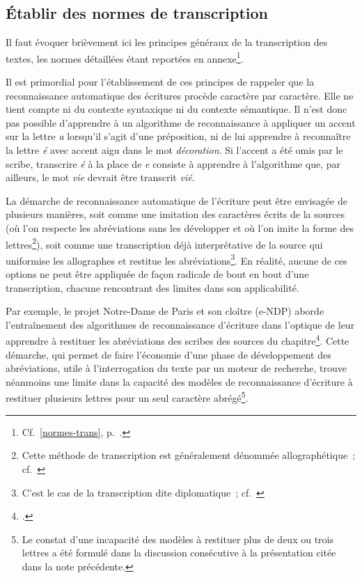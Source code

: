 \documentclass[a4paper,12pt,twoside]{book}
\begin{document}
			\subsection{Établir des normes de transcription}
				Il faut évoquer brièvement ici les principes généraux de la transcription des textes, les normes détaillées étant reportées en annexe\footnote{Cf.~\ref{normes-trans}, p.~\pageref{normes-trans}.}.
				
				Il est primordial pour l'établissement de ces principes de rappeler que la reconnaissance automatique des écritures procède caractère par caractère. Elle ne tient compte ni du contexte syntaxique ni du contexte sémantique. Il n'est donc pas possible d'apprendre à un algorithme de reconnaissance à appliquer un accent sur la lettre \textit{a} lorsqu'il s'agit d'une préposition, ni de lui apprendre à reconnaître la lettre \textit{é} avec accent aigu dans le mot \textit{décoration}. Si l'accent a été omis par le scribe, transcrire \textit{é} à la place de \textit{e} consiste à apprendre à l'algorithme que, par ailleurs, le mot \textit{vie} devrait être transcrit \textit{vié}.
				
				La démarche de reconnaissance automatique de l'écriture peut être envisagée de plusieurs manières, soit comme une imitation des caractères écrits de la sources (où l'on respecte les abréviations sans les développer et où l'on imite la forme des lettres\footnote{Cette méthode de transcription est généralement dénommée allographétique~; cf.~\cite[p.~250 \textit{et passim}]{stutzmannPaleographieStatistiquePour2011a}}), soit comme une transcription déjà interprétative de la source qui uniformise les allographes et restitue les abréviations\footnote{C'est le cas de la transcription dite diplomatique~; cf.~\cite{guyotjeanninDiplomatiqueMedievale2006}}. En réalité, aucune de ces options ne peut être appliquée de façon radicale de bout en bout d'une transcription, chacune rencontrant des limites dans son applicabilité.
				
				Par exemple, le projet Notre-Dame de Paris et son cloître (e-NDP) aborde l'entraînement des algorithmes de reconnaissance d'écriture dans l'optique de leur apprendre à restituer les abréviations des scribes des sources du chapitre\footcite{torresaguilarENDPNotreDameParis2022}. Cette démarche, qui permet de faire l'économie d'une phase de développement des abréviations, utile à l'interrogation du texte par un moteur de recherche, trouve néanmoins une limite dans la capacité des modèles de reconnaissance d'écriture à restituer plusieurs lettres pour un seul caractère abrégé\footnote{Le constat d'une incapacité des modèles à restituer plus de deux ou trois lettres a été formulé dans la discussion consécutive à la présentation citée dans la note précédente.}.
				
\end{document}
